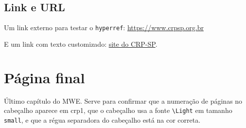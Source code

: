 \documentclass[11pt,a5paper,twoside,openright]{scrbook}
\begin{document}
\section{Link e URL}

Um link externo para testar o \texttt{hyperref}:
\url{https://www.crpsp.org.br}

E um link com texto customizado:
\href{https://www.crpsp.org.br}{site do CRP-SP}.

\chapter{Página final}

Último capítulo do MWE. Serve para confirmar que a numeração
de páginas no cabeçalho aparece em crp1, que o cabeçalho usa
a fonte \texttt{\textbackslash Light} em tamanho \texttt{small},
e que a régua separadora do cabeçalho está na cor correta.
\end{document}
